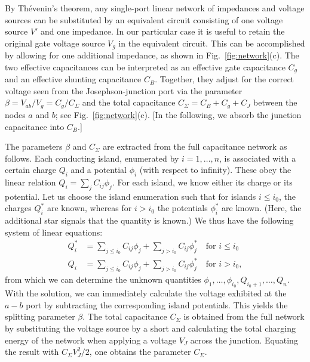 \documentclass[twocolumn,amsmath,amssymb,floatfix,pra,showpacs,eqsecnum,footinbib,superscriptaddress]{revtex4}
\newcounter{fig}
\begin{document}
By Th\'{e}venin's theorem, any single-port linear network of impedances and voltage sources can be substituted by an equivalent circuit consisting of one voltage source $V'$ and one impedance. In our particular case it is useful to retain the original gate voltage source $V_g$ in the equivalent circuit. This can be accomplished by allowing for one additional impedance, as shown in Fig.~\ref{fig:network}(c). The two effective capacitances can be interpreted as an effective gate capacitance $C_g$ and an effective shunting capacitance $C_B$. Together, they adjust for the correct voltage seen from the Josephson-junction port via the parameter $\beta=V_{ab}/V_g=C_g/C_\Sigma$ and the total capacitance $C_\Sigma=C_B+C_g+C_J$ between the nodes $a$ and $b$; see Fig.~\ref{fig:network}(c). [In the following, we absorb the junction capacitance into $C_B$.]

The parameters $\beta$ and $C_\Sigma$ are extracted from the full capacitance network as follows. Each conducting island, enumerated by $i=1,\ldots,n$, is associated with a certain charge $Q_i$ and a potential $\phi_i$ (with respect to infinity). These obey the linear relation $Q_i=\sum_j C_{ij}\phi_j$. For each island, we know either its charge or its potential. Let us choose the island enumeration such that for islands $i\le i_0$, the charges $Q_i^*$ are known, whereas for $i>i_0$ the potentials $\phi_i^*$ are known. (Here, the additional star signals that the quantity is known.) We thus have the following system of linear equations:
\begin{align}
Q_i^*&=\sum_{j\le i_0} C_{ij}\phi_j + \sum_{j>i_0} C_{ij}\phi_j^*\quad \text{for } i\le i_0\\
Q_i&=\sum_{j\le i_0} C_{ij}\phi_j + \sum_{j>i_0} C_{ij}\phi_j^*\quad \text{for } i> i_0,
\end{align}
from which we can determine the unknown quantities $\phi_1,\ldots,\phi_{i_0},Q_{i_0+1},\ldots,Q_n$. With the solution, we can immediately calculate the voltage exhibited at the $a-b$ port by subtracting the corresponding island potentials. This yields the splitting parameter $\beta$. The total capacitance $C_\Sigma$ is obtained from the full network by substituting the voltage source by a short and calculating the total charging energy of the network when applying a voltage $V_J$ across the junction. Equating the result with $C_\Sigma V^2_J/2$, one obtains the parameter $C_\Sigma$.
\end{document}
